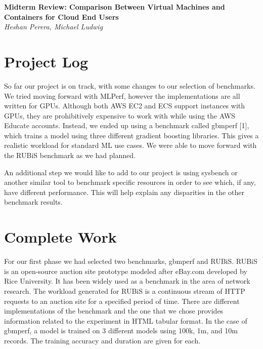 \documentclass[11pt]{article}
\begin{document}
\renewcommand{\headrulewidth}{0pt} 
\renewcommand{\footrulewidth}{0pt} 
\pagestyle{fancy}
\cfoot{}
\lhead{}
\rhead{}
\lfoot{\itshape\textcolor{gray}{CS525T Cloud Computing Paper Review}}

\begin{center}
{\LARGE \bf Midterm Review: Comparison Between Virtual Machines and Containers for Cloud End Users} \\
{\normalsize \emph{Heshan Perera, Michael Ludwig}}\\

\end{center}

\section{Project Log}

So far our project is on track, with some changes to our selection of benchmarks. We tried moving forward with MLPerf, however the implementations are all written for GPUs. Although both AWS EC2 and ECS support instances with GPUs, they are prohibitively expensive to work with while using the AWS Educate accounts. Instead, we ended up using a benchmark called gbmperf [1], which trains a model using three different gradient boosting libraries. This gives a realistic workload for standard ML use cases. We were able to move forward with the RUBiS benchmark as we had planned. 

An additional step we would like to add to our project is using sysbench or another similar tool to benchmark specific resources in order to see which, if any, have different performance. This will help explain any disparities in the other benchmark results.

\section{Complete Work}

For our first phase we had selected two benchmarks, gbmperf and RUBiS. RUBiS is an open-source auction site prototype modeled after eBay.com developed by Rice University. It has been widely used as a benchmark in the area of network research. The workload generated for RUBiS is a continuous stream of HTTP requests to an auction site for a specified period of time. There are different implementations of the benchmark and the one that we chose provides information related to the experiment in HTML tabular format. In the case of gbmperf, a model is trained on 3 different models using 100k, 1m, and 10m records. The training accuracy and duration are given for each.
\end{document}
